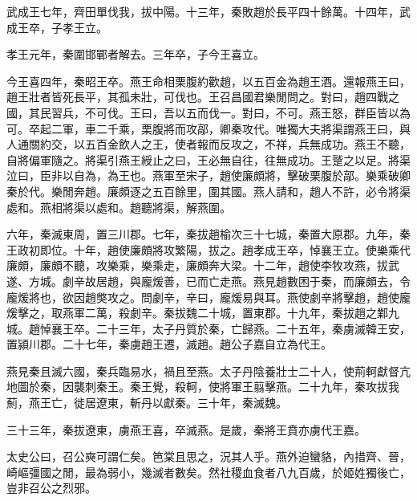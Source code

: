 武成王七年，齊田單伐我，拔中陽。十三年，秦敗趙於長平四十餘萬。十四年，武成王卒，子孝王立。

孝王元年，秦圍邯鄲者解去。三年卒，子今王喜立。

今王喜四年，秦昭王卒。燕王命相栗腹約歡趙，以五百金為趙王酒。還報燕王曰，趙王壯者皆死長平，其孤未壯，可伐也。王召昌國君樂閒問之。對曰，趙四戰之國，其民習兵，不可伐。王曰，吾以五而伐一。對曰，不可。燕王怒，群臣皆以為可。卒起二軍，車二千乘，栗腹將而攻鄗，卿秦攻代。唯獨大夫將渠謂燕王曰，與人通關約交，以五百金飲人之王，使者報而反攻之，不祥，兵無成功。燕王不聽，自將偏軍隨之。將渠引燕王綬止之曰，王必無自往，往無成功。王蹵之以足。將渠泣曰，臣非以自為，為王也。燕軍至宋子，趙使廉頗將，擊破栗腹於鄗。樂乘破卿秦於代。樂閒奔趙。廉頗逐之五百餘里，圍其國。燕人請和，趙人不許，必令將渠處和。燕相將渠以處和。趙聽將渠，解燕圍。

六年，秦滅東周，置三川郡。七年，秦拔趙榆次三十七城，秦置大原郡。九年，秦王政初即位。十年，趙使廉頗將攻繁陽，拔之。趙孝成王卒，悼襄王立。使樂乘代廉頗，廉頗不聽，攻樂乘，樂乘走，廉頗奔大梁。十二年，趙使李牧攻燕，拔武遂、方城。劇辛故居趙，與龐煖善，已而亡走燕。燕見趙數困于秦，而廉頗去，令龐煖將也，欲因趙獘攻之。問劇辛，辛曰，龐煖易與耳。燕使劇辛將擊趙，趙使龐煖擊之，取燕軍二萬，殺劇辛。秦拔魏二十城，置東郡。十九年，秦拔趙之鄴九城。趙悼襄王卒。二十三年，太子丹質於秦，亡歸燕。二十五年，秦虜滅韓王安，置潁川郡。二十七年，秦虜趙王遷，滅趙。趙公子嘉自立為代王。

燕見秦且滅六國，秦兵臨易水，禍且至燕。太子丹陰養壯士二十人，使荊軻獻督亢地圖於秦，因襲刺秦王。秦王覺，殺軻，使將軍王翦擊燕。二十九年，秦攻拔我薊，燕王亡，徙居遼東，斬丹以獻秦。三十年，秦滅魏。

三十三年，秦拔遼東，虜燕王喜，卒滅燕。是歲，秦將王賁亦虜代王嘉。

太史公曰，召公奭可謂仁矣。笆棠且思之，況其人乎。燕外迫蠻貉，內措齊、晉，崎嶇彊國之閒，最為弱小，幾滅者數矣。然社稷血食者八九百歲，於姬姓獨後亡，豈非召公之烈邪。
